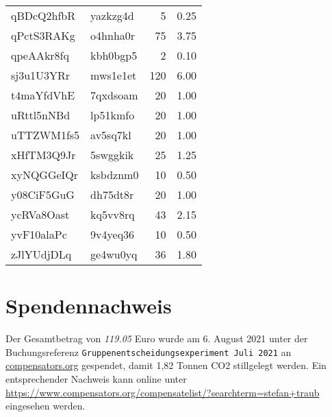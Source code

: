 \documentclass[]{elsarticle} %
\begin{document}
\begin{longtable}{llrr}
qBDcQ2hfbR & yazkzg4d & 5 & 0.25\\
qPctS3RAKg & o4hnha0r & 75 & 3.75\\
qpeAAkr8fq & kbh0bgp5 & 2 & 0.10\\
\addlinespace
sj3u1U3YRr & mws1e1et & 120 & 6.00\\
t4maYfdVhE & 7qxdsoam & 20 & 1.00\\
uRttl5nNBd & lp51kmfo & 20 & 1.00\\
uTTZWM1fs5 & av5sq7kl & 20 & 1.00\\
xHfTM3Q9Jr & 5swggkik & 25 & 1.25\\
\addlinespace
xyNQGGeIQr & ksbdznm0 & 10 & 0.50\\
y08CiF5GuG & dh75dt8r & 20 & 1.00\\
ycRVa8Oast & kq5vv8rq & 43 & 2.15\\
yvF10alaPc & 9v4yeq36 & 10 & 0.50\\
zJlYUdjDLq & ge4wu0yq & 36 & 1.80\\*
\end{longtable}
\endgroup{}

\hypertarget{spendennachweis}{%
\section{Spendennachweis}\label{spendennachweis}}

Der Gesamtbetrag von \emph{119.05} Euro wurde am 6. August 2021 unter
der Buchungsreferenz \texttt{Gruppenentscheidungsexperiment\ Juli\ 2021}
an \url{compensators.org} gespendet, damit 1,82 Tonnen CO2 stillgelegt
werden. Ein entsprechender Nachweis kann online unter
\url{https://www.compensators.org/compensatelist/?searchterm=stefan+traub}
eingesehen werden.
\end{document}
